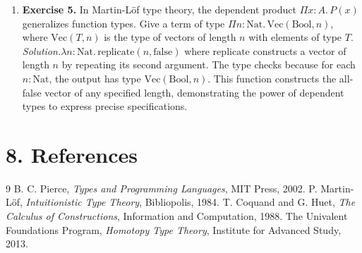\begin{enumerate}[leftmargin=*,itemsep=0.9em]
\item \textbf{Exercise 5.} In Martin-Löf type theory, the dependent product $\Pi x{:}A.\,P(x)$ generalizes function types. Give a term of type $\Pi n{:}\mathrm{Nat}.\,\mathrm{Vec}(\mathrm{Bool}, n)$, where $\mathrm{Vec}(T, n)$ is the type of vectors of length $n$ with elements of type $T$. \emph{Solution.}$\lambda n{:}\mathrm{Nat}.\,\mathrm{replicate}(n, \mathrm{false})$ where $\mathrm{replicate}$ constructs a vector of length $n$ by repeating its second argument. The type checks because for each $n : \mathrm{Nat}$, the output has type $\mathrm{Vec}(\mathrm{Bool}, n)$. This function constructs the all-false vector of any specified length, demonstrating the power of dependent types to express precise specifications.

\end{enumerate}
\section*{8. References}
\begin{thebibliography}{9}
 B. C. Pierce, \emph{Types and Programming Languages}, MIT Press, 2002.
 P. Martin-L{\"o}f, \emph{Intuitionistic Type Theory}, Bibliopolis, 1984.
 T. Coquand and G. Huet, \emph{The Calculus of Constructions}, Information and Computation, 1988.
 The Univalent Foundations Program, \emph{Homotopy Type Theory}, Institute for Advanced Study, 2013.
\end{thebibliography}
